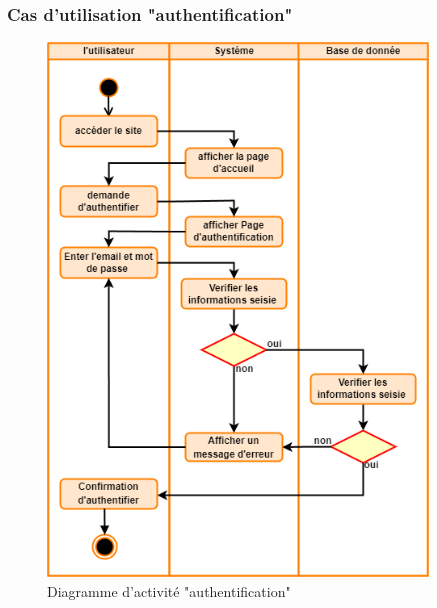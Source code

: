 \documentclass[edit,12pt,a4paper,ChapStyle,oneside,doubleinterligne]{report}
\begin{document}
\subsubsection{Cas d'utilisation "authentification"}
\begin{figure}[h!]\label{fig:activite auth}
    \centering
    \includegraphics[width=0.9\textwidth]{images/activite Authontification.png}
    \caption{Diagramme d'activité "authentification"}
\end{figure}
\clearpage
\end{document}
